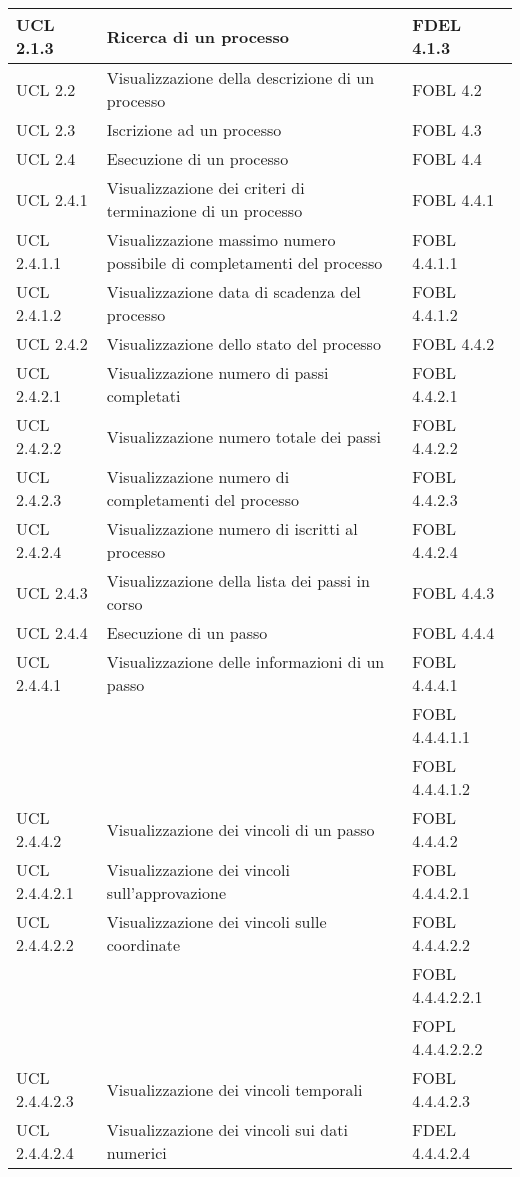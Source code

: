 \begin{longtable}{lXp{}}
\midrule 
UCL 2.1.3&Ricerca di un processo&FDEL 4.1.3\\ 
\midrule 
UCL 2.2&Visualizzazione della descrizione di un processo&FOBL 4.2\\ 
\midrule 
UCL 2.3&Iscrizione ad un processo&FOBL 4.3\\ 
\midrule 
UCL 2.4&Esecuzione di un processo&FOBL 4.4\\ 
\midrule 
UCL 2.4.1&Visualizzazione dei criteri di terminazione di un processo&FOBL 4.4.1\\
\midrule
UCL 2.4.1.1&Visualizzazione massimo numero possibile di completamenti del processo&FOBL 4.4.1.1\\ 
\midrule 
UCL 2.4.1.2&Visualizzazione data di scadenza del processo&FOBL 4.4.1.2\\ 
\midrule 
UCL 2.4.2&Visualizzazione dello stato del processo&FOBL 4.4.2\\ 
\midrule 
UCL 2.4.2.1&Visualizzazione numero di passi completati&FOBL 4.4.2.1\\ 
\midrule 
UCL 2.4.2.2&Visualizzazione numero totale dei passi&FOBL 4.4.2.2\\ 
\midrule 
UCL 2.4.2.3&Visualizzazione numero di completamenti del processo&FOBL 4.4.2.3\\ 
\midrule 
UCL 2.4.2.4&Visualizzazione numero di iscritti al processo&FOBL 4.4.2.4\\ 
\midrule 
UCL 2.4.3&Visualizzazione della lista dei passi in corso&FOBL 4.4.3\\ 
\midrule 
UCL 2.4.4&Esecuzione di un passo&FOBL 4.4.4\\ 
\midrule 
UCL 2.4.4.1&Visualizzazione delle informazioni di un passo&FOBL 4.4.4.1\\ 
&&FOBL 4.4.4.1.1\\
&&FOBL 4.4.4.1.2\\  
\midrule 
UCL 2.4.4.2&Visualizzazione dei vincoli di un passo&FOBL 4.4.4.2\\ 
\midrule 
UCL 2.4.4.2.1&Visualizzazione dei vincoli sull'approvazione&FOBL 4.4.4.2.1\\ 
\midrule 
UCL 2.4.4.2.2&Visualizzazione dei vincoli sulle coordinate&FOBL 4.4.4.2.2\\
&&FOBL 4.4.4.2.2.1\\
&&FOPL 4.4.4.2.2.2\\
\midrule 
UCL 2.4.4.2.3&Visualizzazione dei vincoli temporali&FOBL 4.4.4.2.3\\ 
\midrule 
UCL 2.4.4.2.4&Visualizzazione dei vincoli sui dati numerici&FDEL 4.4.4.2.4\\

\end{longtable}
